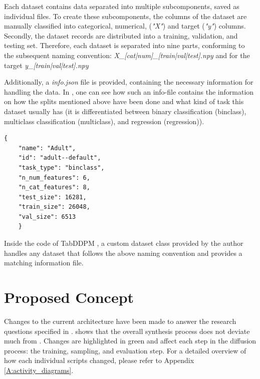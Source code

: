Each dataset contains data separated into multiple subcomponents, saved as individual files.
To create these subcomponents, the columns of the dataset are manually classified into categorical, numerical, (\textit{"X"}) and target (\textit{"y"}) columns.
Secondly, the dataset records are distributed into a training, validation, and testing set.
Therefore, each dataset is separated into nine parts, conforming to the subsequent naming convention:
\textit{X\_[cat|num]\_[train|val|test].npy} and for the target \textit{y\_[train|val|test].npy}

Additionally, a \textit{info.json} file is provided, containing the necessary information for handling the data.
In , one can see how such an info-file contains the information on how the splits mentioned above have been done and what kind of task this dataset usually has (it is differentiated between binary classification (binclass), multiclass classification (multiclass), and regression (regression)).
\begin{lstlisting}[label={lst:info},caption={Example Data-info File}]
    {
    "name": "Adult",
    "id": "adult--default",
    "task_type": "binclass",
    "n_num_features": 6,
    "n_cat_features": 8,
    "test_size": 16281,
    "train_size": 26048,
    "val_size": 6513
    }
\end{lstlisting}
Inside the code of TabDDPM \cite{akim2023TabDDPMModellingTabular}, a custom dataset class provided by the author handles any dataset that follows the above naming convention and provides a matching information file.

\section{Proposed Concept}
\label{ch:conceptualDesign-changes}

Changes to the current architecture have been made to answer the research questions specified in .
 shows that the overall synthesis process does not deviate much from .
Changes are highlighted in green and affect each step in the diffusion process: the training, sampling, and evaluation step.
For a detailed overview of how each individual scripts changed, please refer to Appendix \ref{A:activity_diagrams}.


